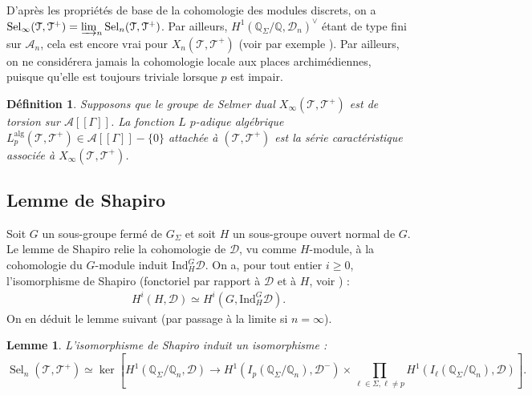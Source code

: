 \documentclass[12pt]{amsart}
\newcommand\bQ{\mathbb{Q}}
\newcommand\cA{\mathcal{A}}
\newcommand\cD{\mathcal{D}}
\newcommand\cT{\mathcal{T}}
\newcommand{\Ind}{\mathrm{Ind}}
\newcommand{\alg}{\textrm{alg}}
\DeclareMathOperator{\Sel}{Sel}
\theoremstyle{defstyle}
\newtheorem{definition}[subsubsection]{Définition}
\theoremstyle{thmstyle}
\newtheorem{lemme}[subsubsection]{Lemme}
\begin{document}
D'après les propriétés de base de la cohomologie des modules discrets, on a $\Sel_\infty(\cT,\cT^+) = \varinjlim_n \Sel_n(\cT,\cT^+)$. Par ailleurs, $H^1(\bQ_\Sigma/\bQ,\cD_n)^\vee$ étant de type fini sur $\cA_n$, cela est encore vrai pour $X_n(\cT,\cT^+)$ (voir par exemple \cite[Chap VIII, §3, Theorem 20]{neukirchcohomology}). Par ailleurs, on ne considérera jamais la cohomologie locale aux places archimédiennes, puisque qu'elle est toujours triviale lorsque $p$ est impair.

\begin{definition}\label{def:L_p(X)}
	Supposons que le groupe de Selmer dual $X_\infty(\cT,\cT^+)$ est de torsion sur $\cA[[\Gamma]]$. La fonction $L$ $p$-adique algébrique $L^\alg_p(\cT,\cT^+) \in \cA[[\Gamma]]-\{0\}$ attachée à $(\cT,\cT^+)$ est la série caractéristique associée à $X_\infty(\cT,\cT^+)$.
\end{definition}

\subsection{Lemme de Shapiro}

Soit $G$ un sous-groupe fermé de $G_{\Sigma}$ et soit $H$ un sous-groupe ouvert normal de $G$. Le lemme de Shapiro relie la cohomologie de $\cD$, vu comme $H$-module, à la cohomologie du $G$-module induit $\Ind_H^G \cD$. On a, pour tout entier $i\geq 0$, l'isomorphisme de Shapiro (fonctoriel par rapport à $\cD$ et à $H$, voir \cite[Chap. 8, §1.]{sel}) : 
\begin{align}\label{Shapiro}
H^i(H,\cD) \simeq H^i(G,\Ind^G_H \cD).
\end{align}
On en déduit le lemme suivant (par passage à la limite si $n=\infty$).

\begin{lemme}\label{Def_alternative_Sel_n}
	L'isomorphisme de Shapiro induit un isomorphisme : 
	$$
	\Sel_n(\cT,\cT^+)\simeq\ker \left[ H^1(\bQ_{\Sigma}/\bQ_n,\cD) \longrightarrow H^1(I_{p}(\bQ_{\Sigma}/\bQ_n),\cD^-) \times \prod_{\ell \in \Sigma,\ell\neq p} H^1(I_{\ell}(\bQ_{\Sigma}/\bQ_n),\cD)  \right].
	$$
\end{lemme}
\end{document}
